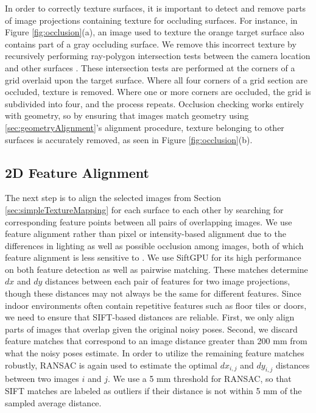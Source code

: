 \documentclass[]{spie}  %
\begin{document}
In order to correctly texture surfaces, it is important to detect and
remove parts of image projections containing texture for occluding
surfaces. For instance, in Figure \ref{fig:occlusion}(a), an image
used to texture the orange target surface also contains part of a gray
occluding surface. We remove this incorrect texture by recursively
performing ray-polygon intersection tests between the camera location
and other surfaces \cite{rayintersection}. These intersection tests
are performed at the corners of a grid overlaid upon the target
surface. Where all four corners of a grid section are occluded,
texture is removed. Where one or more corners are occluded, the grid
is subdivided into four, and the process repeats. Occlusion checking
works entirely with geometry, so by ensuring that images match
geometry using \ref{sec:geometryAlignment}'s alignment procedure,
texture belonging to other surfaces is accurately removed, as seen in
Figure \ref{fig:occlusion}(b).

\subsection{2D Feature Alignment}
\label{sec:robustSIFTFeatureMatching}
The next step is to align the selected images from Section
\ref{sec:simpleTextureMapping} for each surface to each other by
searching for corresponding feature points between all pairs of
overlapping images. We use feature alignment rather than pixel or
intensity-based alignment due to the differences in lighting as well
as possible occlusion among images, both of which feature alignment is
less sensitive to \cite{lowe1999object, mikolajczyk2005performance,
  szeliski2006image}. We use SiftGPU \cite{siftgpu} for its high
performance on both feature detection as well as pairwise
matching. These matches determine $dx$ and $dy$ distances between each
pair of features for two image projections, though these distances may
not always be the same for different features. Since indoor
environments often contain repetitive features such as floor tiles or
doors, we need to ensure that SIFT-based distances are
reliable. First, we only align parts of images that overlap given the
original noisy poses. Second, we discard feature matches that
correspond to an image distance greater than 200 mm from what the
noisy poses estimate. In order to utilize the remaining feature
matches robustly, RANSAC \cite{fischler1981random} is again used to
estimate the optimal $dx_{i,j}$ and $dy_{i,j}$ distances between two
images $i$ and $j$. We use a 5 mm threshold for RANSAC, so that SIFT
matches are labeled as outliers if their distance is not within 5 mm
of the sampled average distance.
\end{document}
